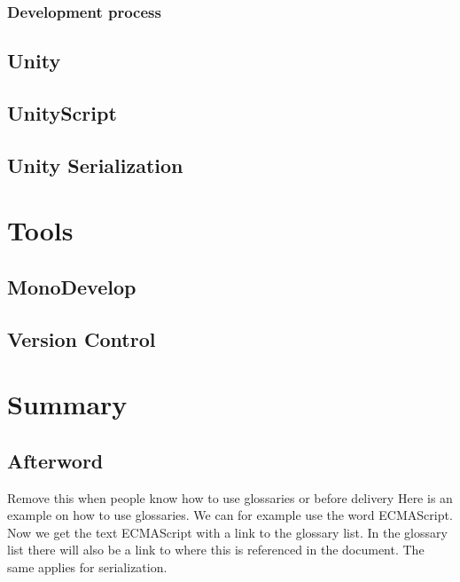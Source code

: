 \documentclass[BSP,english,oneside]{classes/gucthesis}
\newcommand{\todo}[1]{{\color{green}#1}}
\begin{document}
		\section{Development process}
		


	\chapter{Unity}
		\label{chap:Unity}
		


	\chapter{UnityScript}
		\label{chap:UnityScript}
		

	\chapter{Unity Serialization}
		\label{chap:UnitySerialization}
		

\part{Tools}

	\chapter{MonoDevelop}
		\label{chap:MonoDevelop}
		


	\chapter{Version Control}
		\label{chap:VersionControl}
		

\part{Summary}

	\chapter{Afterword}
		\label{chap:afterword}
		


\todo{Remove this when people know how to use glossaries or before delivery}
Here is an example on how to use glossaries. We can for example use the word
\gls{ECMAScript}. Now we get the text ECMAScript with a link to the glossary
list. In the glossary list there will also be a link to where this is 
referenced in the document. The same applies for \gls{serialization}.
\end{document}
